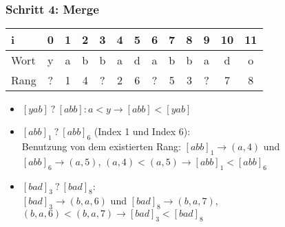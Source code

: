 \documentclass{beamer}
\begin{document}
\begin{frame}
\frametitle{Schritt 4: Merge}
\begin{table}
\begin{tabular}{l|c c c c c c c c c c c c}
    \toprule
    i    & 0 & 1 & 2 & 3 & 4 & 5 & 6 & 7 & 8 & 9 & 10 & 11 \\
    \midrule
    Wort & y & a & b & b & a & d & a & b & b & a & d  & o  \\
    \midrule
    Rang & ? & 1 & 4 & ? & 2 & 6 & ? & 5 & 3 & ? & 7  & 8 \\
    \bottomrule
\end{tabular}
\end{table}
\vspace{2mm}
\begin{itemize}
    \item $[yab]\:?\:[abb]: a < y \rightarrow [abb] < [yab]$
    \item $[abb]_1\:?\:[abb]_6$ (Index 1 und Index 6): \\ Benutzung von dem existierten Rang: $[abb]_1 \rightarrow (a,4)$ und $[abb]_6 \rightarrow (a,5)$, $(a,4) < (a,5) \rightarrow [abb]_1 < [abb]_6$
    \item $[bad]_3\:?\:[bad]_8$: \\ $[bad]_3 \rightarrow (b,a,6)$ und $[bad]_8 \rightarrow (b,a,7)$, $(b,a,6) < (b,a,7) \rightarrow [bad]_3 < [bad]_8$
\end{itemize}
\end{frame}
\end{document}

